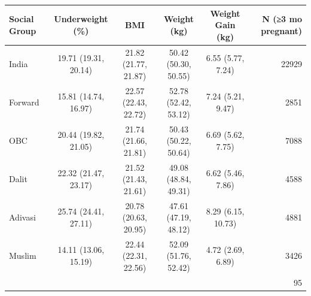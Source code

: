 \begin{tabular}{lccccr}
\toprule
Social Group & Underweight (\%) & BMI & Weight (kg) & Weight Gain (kg) & N (≥3 mo pregnant) \\
\midrule
India&19.71 (19.31, 20.14)&21.82 (21.77, 21.87)&50.42 (50.30, 50.55)&6.55 (5.77, 7.24)&22929\\
Forward&15.81 (14.74, 16.97)&22.57 (22.43, 22.72)&52.78 (52.42, 53.12)&7.24 (5.21, 9.47)&2851\\
OBC&20.44 (19.82, 21.05)&21.74 (21.66, 21.81)&50.43 (50.22, 50.64)&6.69 (5.62, 7.75)&7088\\
Dalit&22.32 (21.47, 23.17)&21.52 (21.43, 21.61)&49.08 (48.84, 49.31)&6.62 (5.46, 7.86)&4588\\
Adivasi&25.74 (24.41, 27.11)&20.78 (20.63, 20.95)&47.61 (47.19, 48.12)&8.29 (6.15, 10.73)&4881\\
Muslim&14.11 (13.06, 15.19)&22.44 (22.31, 22.56)&52.09 (51.76, 52.42)&4.72 (2.69, 6.89)&3426\\
&&&&&95\\
\bottomrule
\end{tabular}
